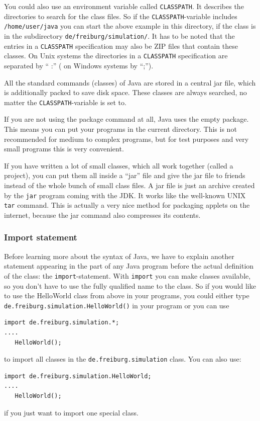 You could also use an environment variable called \verb|CLASSPATH|. It
describes the directories to search for the class files. So if the
\verb|CLASSPATH|-variable includes \verb|/home/user/java| you can
start the above example in this directory, if the class is in the 
subdirectory  \verb|de/freiburg/simulation/|. It has to be noted that
the entries in a \verb|CLASSPATH| specification may also be ZIP files
that contain these classes. On Unix systems the directories in a
\verb|CLASSPATH| specification are separated by `` :'' ( on Windows systems
by ``;'').


All the standard commands (classes) of Java are stored in a central jar
file, which is additionally packed to save disk space. These classes
are always searched, no matter the \verb|CLASSPATH|-variable is set to.

If you are not using the package command at all, Java uses the empty 
package. This means you can put your programs in the current directory.
This is not recommended for medium to complex programs, but for
test purposes and very small programs this is very convenient.

If you have written a lot of small classes, which all work together
(called a project), you
can put them all inside a ``jar'' file and give the jar file
to friends instead of the whole bunch of small class files.
A jar file is just an archive created by the \verb|jar| program 
coming with the JDK. It works like the well-known UNIX \verb|tar|
command. This is actually a very nice method for packaging
applets on the internet, because the jar command also compresses
its contents.  

\subsubsection{Import statement}
Before learning more about the syntax of Java, we have to explain another
statement appearing in the part of any Java program before the actual
definition of the class: the \verb|import|-statement. With \verb|import|
you can make classes available, so you don't have to use the fully
qualified name to the class. So if you would like to
use the HelloWorld class from above in your programs, you could either
type \verb|de.freiburg.simulation.HelloWorld()| in your program
or you can use
\begin{verbatim}
import de.freiburg.simulation.*;
....
   HelloWorld();
\end{verbatim}
to import all classes in the \verb|de.freiburg.simulation| class.
You can also use:
\begin{verbatim}
import de.freiburg.simulation.HelloWorld;
....
   HelloWorld();
\end{verbatim}
if you just want to import one special class.

